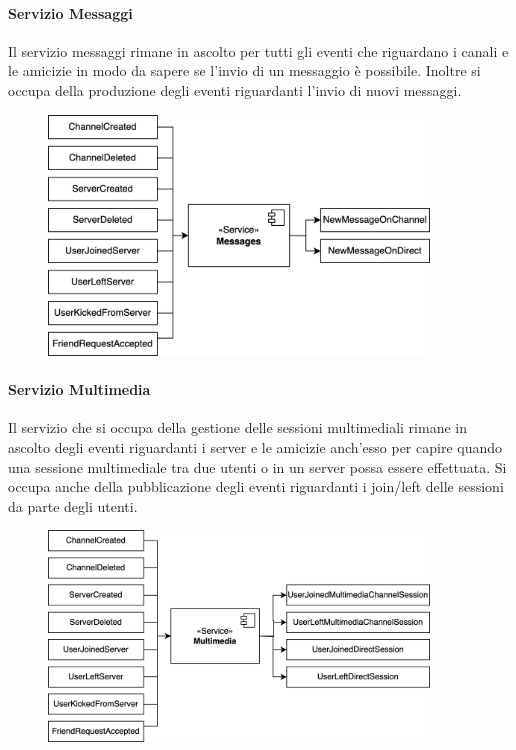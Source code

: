 %
%
%
\paragraph{Servizio Messaggi}

Il servizio messaggi rimane in ascolto per tutti gli eventi che riguardano i canali e le amicizie in modo da sapere se l'invio di un messaggio è possibile.
Inoltre si occupa della produzione degli eventi riguardanti l'invio di nuovi messaggi.

\begin{figure}[H]
    \centering
    \includegraphics[width=0.9\textwidth]{sections/03-design/img/events/piperchat-EventiMessages.jpg}
    \label{fig:messages-events}
\end{figure}

%
%
%
\paragraph{Servizio Multimedia}

Il servizio che si occupa della gestione delle sessioni multimediali rimane in ascolto degli eventi riguardanti i server e le amicizie anch'esso per capire quando una sessione multimediale tra due utenti o in un server possa essere effettuata.
Si occupa anche della pubblicazione degli eventi riguardanti i join/left delle sessioni da parte degli utenti.

\begin{figure}[H]
    \centering
    \includegraphics[width=0.9\textwidth]{sections/03-design/img/events/piperchat-EventiMultimedia.jpg}
    \label{fig:multimedia-events}
\end{figure}

